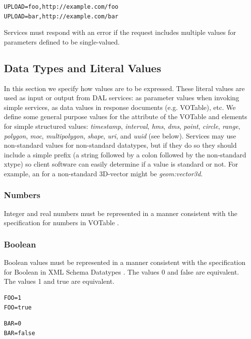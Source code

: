 \documentclass[11pt,letter]{ivoa}
\begin{document}
\begin{verbatim}
UPLOAD=foo,http://example.com/foo
UPLOAD=bar,http://example.com/bar
\end{verbatim}

Services must respond with an error if the request includes multiple values for 
parameters defined to be single-valued.

\subsection{Data Types and Literal Values}
In this section we specify how values are to be expressed. These literal values 
are used as input or output from DAL services: as parameter values when 
invoking simple services, as data values in response documents (e.g. VOTable), 
etc. We define some general purpose values for the  attribute of 
the VOTable  and  elements  for simple
structured values: \emph{timestamp}, \emph{interval},
\emph{hms}, \emph{dms},
\emph{point}, \emph{circle}, \emph{range}, \emph{polygon}, \emph{moc}, 
\emph{multipolygon}, \emph{shape}, \emph{uri}, and \emph{uuid} (see below). 
Services may 
use non-standard  values for non-standard datatypes, but if they 
do so they should include a simple prefix (a string followed by a colon 
followed by the non-standard xtype) so client software can easily determine 
if a value is standard or not. For example, an  for a 
non-standard 3D-vector might be \emph{geom:vector3d}.

\subsubsection{Numbers}
Integer and real numbers must be represented in a manner consistent with the 
specification for numbers in VOTable \citep{2019ivoa.spec.1021O}.

\subsubsection{Boolean}
Boolean values must be represented in a manner consistent with the 
specification 
for Boolean in XML Schema Datatypes \citep{std:XSD2}. The values 0 and false 
are equivalent. The values 1 and true are equivalent.  

\begin{verbatim}
FOO=1
FOO=true
\end{verbatim}

\begin{verbatim}
BAR=0
BAR=false
\end{verbatim}
\end{document}
